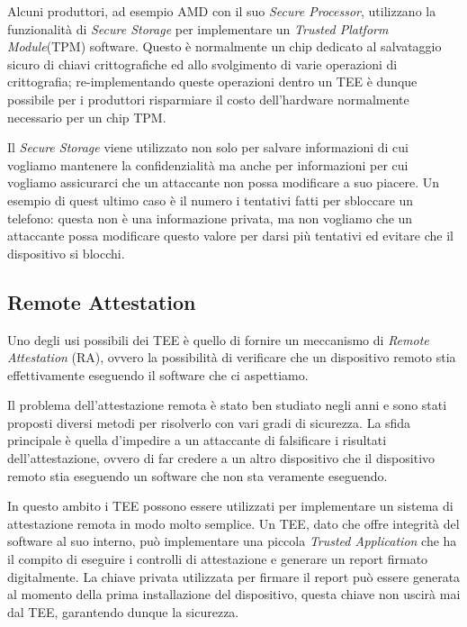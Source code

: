 \documentclass[12pt,italian]{report}
\begin{document}
Alcuni produttori, ad esempio AMD con il suo
\textit{Secure Processor}, utilizzano la
funzionalità di \textit{Secure Storage} per implementare un
\textit{Trusted Platform Module}(TPM) software\cite{amd2020ftpm}.
Questo è normalmente un chip dedicato al salvataggio sicuro di chiavi crittografiche
ed allo svolgimento di varie operazioni di crittografia; re-implementando
queste operazioni dentro un TEE è dunque possibile per i produttori risparmiare
il costo dell'hardware normalmente necessario per un chip TPM.

Il \textit{Secure Storage} viene utilizzato non solo per salvare
informazioni di cui vogliamo mantenere la confidenzialità ma anche per
informazioni per cui vogliamo assicurarci che un attaccante non possa
modificare a suo piacere.
Un esempio di quest ultimo caso è il numero i tentativi fatti per sbloccare
un telefono: questa non è una informazione privata, ma non vogliamo che un
attaccante possa modificare questo valore per darsi più tentativi ed evitare
che il dispositivo si blocchi.


\subsection{Remote Attestation}
\label{subsec:remote-attestation}
Uno degli usi possibili dei TEE è quello di fornire un meccanismo di
\textit{Remote Attestation} (RA), ovvero la possibilità di verificare che
un dispositivo remoto stia effettivamente eseguendo il software che
ci aspettiamo.

Il problema dell'attestazione remota è stato ben studiato negli anni e
sono stati proposti diversi metodi per risolverlo con vari gradi di
sicurezza.
La sfida principale è quella d'impedire a un attaccante di falsificare
i risultati dell'attestazione, ovvero di far credere a un altro dispositivo
che il dispositivo remoto stia eseguendo un software che non sta veramente
eseguendo.

In questo ambito i TEE possono essere utilizzati per implementare un sistema
di attestazione remota in modo molto semplice.
Un TEE, dato che offre integrità del software al suo interno, può implementare
una piccola \textit{Trusted Application} che ha il compito di eseguire
i controlli di attestazione e generare un report firmato digitalmente.
La chiave privata utilizzata per firmare il report può essere generata al
momento della prima installazione del dispositivo, questa chiave non uscirà
mai dal TEE, garantendo dunque la sicurezza.
\end{document}
